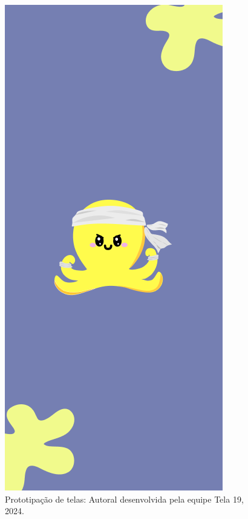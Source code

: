 \documentclass[12pt, openany, oneside, a4paper, english, brazil]{abntex2}   %
\begin{document}
\begin{figure}
    \centering
    \includegraphics[scale=0.7]{figuras/Math.Pow App/SplashScreen.png}
    \caption{Prototipação de telas: Autoral desenvolvida pela equipe Tela 19, 2024.}
    \label{fig:nome-da-imagem}
\end{figure}
\end{document}
